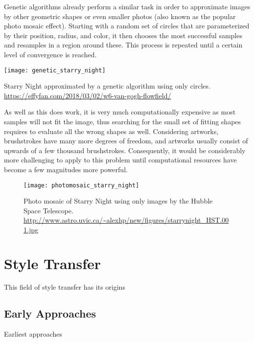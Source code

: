 Genetic algorithms already perform a similar task in order to approximate images by other geometric shapes or even smaller photos (also known as the popular photo mosaic effect).
Starting with a random set of circles that are parameterized by their position, radius, and color, it then chooses the most successful samples and resamples in a region around these.
This process is repeated until a certain level of convergence is reached.


\begin{marginfigure}
    \texttt{[image: genetic\_starry\_night]}
    \caption[]{Starry Night approximated by a genetic algorithm using only circles. \url{https://effyfan.com/2018/03/02/w6-van-gogh-flowfield/}}
\end{marginfigure}

As well as this does work, it is very much computationally expensive as most samples will not fit the image, thus searching for the small set of fitting shapes requires to evaluate all the wrong shapes as well.
Considering artworks, brushstrokes have many more degrees of freedom, and artworks usually consist of upwards of a few thousand brushstrokes.
Consequently, it would be considerably more challenging to apply to this problem until computational resources have become a few magnitudes more powerful.

\begin{figure}
    \texttt{[image: photomosaic\_starry\_night]}
    \caption[]{Photo mosaic of Starry Night using only images by the Hubble Space Telescope. \url{http://www.astro.uvic.ca/~alexhp/new/figures/starrynight_HST.001.jpg}}
\end{figure}

\section{Style Transfer}

This field of style transfer has its origins 

\subsection{Early Approaches}
Earliest approaches

